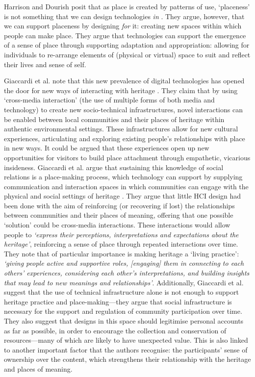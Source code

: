 Harrison and Dourish posit that as place is created by patterns of use, `placeness' is not something that we can design technologies \textit{in} \citep{harrison1996}. They argue, however, that we can support placeness by designing \textit{for} it: creating new spaces within which people can make place. They argue that technologies can support the emergence of a sense of place through supporting adaptation and appropriation: allowing for individuals to re-arrange elements of (physical or virtual) space to suit and reflect their lives and sense of self.

Giaccardi et al. note that this new prevalence of digital technologies has opened the door for new ways of interacting with heritage \citep{Giaccardi2008}. They claim that by using `cross-media interaction' (the use of multiple forms of both media and technology) to create new socio-technical infrastructures, novel interactions can be enabled between local communities and their places of heritage within authentic environmental settings. These infrastructures allow for new cultural experiences, articulating and exploring existing people's relationships with place in new ways. It could be argued that these experiences open up new opportunities for visitors to build place attachment through empathetic, vicarious insideness. Giaccardi et al. argue that sustaining this knowledge of social relations is a place-making process, which technology can support by supplying communication and interaction spaces in which communities can engage with the physical and social settings of heritage \citep{Giaccardi2008}. They argue that little HCI design had been done with the aim of reinforcing (or recovering if lost) the relationships between communities and their places of meaning, offering that one possible `solution' could be cross-media interactions. These interactions would allow people to \textit{`express their perceptions, interpretations and expectations about the heritage'}, reinforcing a sense of place through repeated interactions over time. They note that of particular importance is making heritage a `living practice': \textit{`giving people active and supportive roles, [engaging] them in connecting to each others' experiences, considering each other's interpretations, and building insights that may lead to new meanings and relationships'}. Additionally, Giaccardi et al. suggest that the use of technical infrastructure alone is not enough to support heritage practice and place-making---they argue that social infrastructure is necessary for the support and regulation of community participation over time. They also suggest that designs in this space should legitimise personal accounts as far as possible, in order to encourage the collection and conservation of resources---many of which are likely to have unexpected value. This is also linked to another important factor that the authors recognise: the participants' sense of ownership over the content, which strengthens their relationship with the heritage and places of meaning.

